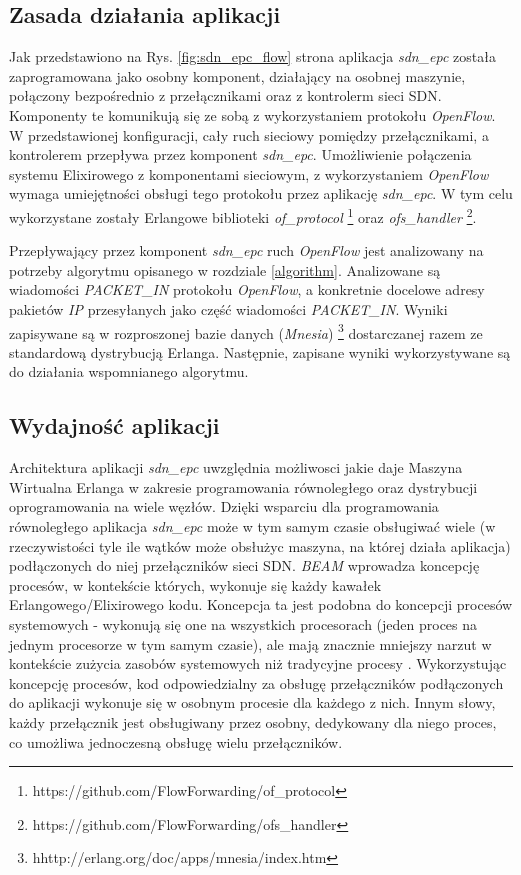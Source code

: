 \subsection{Zasada działania aplikacji}

Jak przedstawiono na Rys. \ref{fig:sdn_epc_flow} strona
\pageref{fig:sdn_epc_flow} aplikacja \textit{sdn\_epc} została zaprogramowana
jako osobny komponent, działający na osobnej maszynie, połączony bezpośrednio z
przełącznikami oraz z kontrolerm sieci SDN. Komponenty te komunikują się ze
sobą z wykorzystaniem protokołu \textit{OpenFlow}. W przedstawionej konfiguracji,
cały ruch sieciowy pomiędzy przełącznikami, a kontrolerem przepływa przez
komponent \textit{sdn\_epc}. Umożliwienie połączenia systemu Elixirowego z
komponentami sieciowym, z wykorzystaniem \textit{OpenFlow} wymaga umiejętności
obsługi tego protokołu przez aplikację \textit{sdn\_epc}. W tym celu
wykorzystane zostały Erlangowe biblioteki \textit{of\_protocol}
\footnote{https://github.com/FlowForwarding/of\_protocol} oraz
\textit{ofs\_handler} \footnote{https://github.com/FlowForwarding/ofs\_handler}.

Przepływający przez komponent \textit{sdn\_epc} ruch \textit{OpenFlow} jest
analizowany na potrzeby algorytmu opisanego w rozdziale \ref{algorithm}.
Analizowane są wiadomości \textit{PACKET\_IN} protokołu \textit{OpenFlow}, a
konkretnie docelowe adresy pakietów \textit{IP} przesyłanych jako część
wiadomości \textit{PACKET\_IN}. Wyniki zapisywane są w rozproszonej bazie danych
(\textit{Mnesia}) \footnote{hhttp://erlang.org/doc/apps/mnesia/index.htm}
dostarczanej razem ze standardową dystrybucją Erlanga. Następnie, zapisane
wyniki wykorzystywane są do działania wspomnianego algorytmu.

\subsection{Wydajność aplikacji}

Architektura aplikacji \textit{sdn\_epc} uwzględnia możliwosci jakie daje
Maszyna Wirtualna Erlanga w zakresie programowania równoległego oraz dystrybucji
oprogramowania na wiele węzłów. Dzięki wsparciu dla programowania równoległego
aplikacja \textit{sdn\_epc} może w tym samym czasie obsługiwać wiele (w
rzeczywistości tyle ile wątków może obsłużyc maszyna, na której działa
aplikacja) podłączonych do niej przełączników sieci SDN. \textit{BEAM} wprowadza
koncepcję procesów, w kontekście których, wykonuje się każdy kawałek
Erlangowego/Elixirowego kodu. Koncepcja ta jest podobna do koncepcji procesów
systemowych - wykonują się one na wszystkich procesorach (jeden proces na
jednym procesorze w tym samym czasie), ale mają znacznie mniejszy narzut w
kontekście zużycia zasobów systemowych niż tradycyjne procesy \cite{progelixir}.
Wykorzystując koncepcję procesów, kod odpowiedzialny za obsługę przełączników
podłączonych do aplikacji wykonuje się w osobnym procesie dla każdego z nich.
Innym słowy, każdy przełącznik jest obsługiwany przez osobny, dedykowany dla
niego proces, co umożliwa jednoczesną obsługę wielu przełączników.

